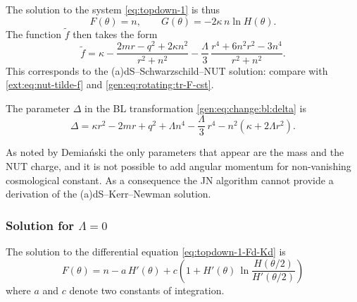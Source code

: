 The solution to the system \eqref{eq:topdown-1} is thus
\begin{equation}
	F(\theta) = n, \qquad
	G(\theta) = - 2 \kappa\, n \ln H(\theta).
\end{equation} 
The function $\tilde f$ then takes the form
\begin{equation}
	\label{eq:topdown-1:tilde-f-lambda}
	\tilde f = \kappa - \frac{2m r - q^2 + 2 \kappa n^2}{r^2 + n^2} - \frac{\Lambda}{3}\,\frac{r^4 + 6 n^2 r^2 - 3 n^4}{r^2 + n^2}.
\end{equation} 
This corresponds to the (a)dS--Schwarzschild--NUT solution: compare with \eqref{ext:eq:nut-tilde-f} and \eqref{gen:eq:rotating:tr-F-cst}.

The parameter $\Delta$ in the BL transformation \eqref{gen:eq:change:bl:delta} is
\begin{equation}
	\Delta = \kappa r^2 - 2 m r + q^2 + \Lambda n^4 - \frac{\Lambda}{3}\, r^4 - n^2 (\kappa + 2 \Lambda r^2 ).
\end{equation} 

As noted by Demiański the only parameters that appear are the mass and the NUT charge, and it is not possible to add angular momentum for non-vanishing cosmological constant.\footnotemark{}%
As a consequence the JN algorithm cannot provide a derivation of the (a)dS--Kerr--Newman solution.


\subsubsection{Solution for \texorpdfstring{$\Lambda = 0$}{vanishing cosmological constant}}
\label{sec:derivation:stationary:solution-no-cosmo}


The solution to the differential equation \eqref{eq:topdown-1-Fd-Kd} is
\begin{equation}
	F(\theta) = n - a\, H'(\theta) + c \left( 1 + H'(\theta)\, \ln \frac{H(\theta/2)}{H'(\theta/2)} \right)
\end{equation}
where $a$ and $c$ denote two constants of integration.

